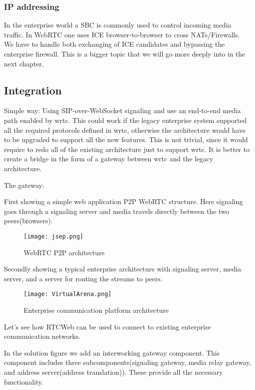 \subsubsection{IP addressing}
In the enterprise world a SBC is commonly used to control incoming media traffic. In WebRTC one uses ICE browser-to-browser to cross NATs/Firewalls. We have to handle both exchanging of ICE candidates and bypassing the enterprise firewall. This is a bigger topic that we will go more deeply into in the next chapter.

\subsection{Integration}
Simple way:
Using SIP-over-WebSocket signaling and use an end-to-end media path enabled by \gls{wrtc}. This could work if the legacy enterprise system supported all the required protocols defined in \gls{wrtc}, otherwise the architecture would have to be upgraded to support all the new features. This is not trivial, since it would require to redo all of the existing architecture just to support \gls{wrtc}. It is better to create a bridge in the form of a gateway between \gls{wrtc} and the legacy architecture.

The gateway:

First showing a simple web application P2P WebRTC structure. Here signaling goes through a signaling server and media travels directly between the two peers(browsers).

\begin{figure}[here]
\centerline{\texttt{[image: jsep.png]}}
\caption{WebRTC P2P architecture}
\label{fig:jsep}
\end{figure}

Secondly showing a typical enterprise architecture with signaling server, media server, and a server for routing the streams to peers.

\begin{figure}[here]
\centerline{\texttt{[image: VirtualArena.png]}}
\caption{Enterprise communication platform architecture}
\label{fig:VirtualArenaArchitecture}
\end{figure}

Let's see how RTCWeb can be used to connect to existing enterprise communication networks.

In the solution figure we add an interworking gateway component. This component includes three subcomponents(signaling gateway, media relay gateway, and address server(address translation)). These provide all the necessary functionality.

